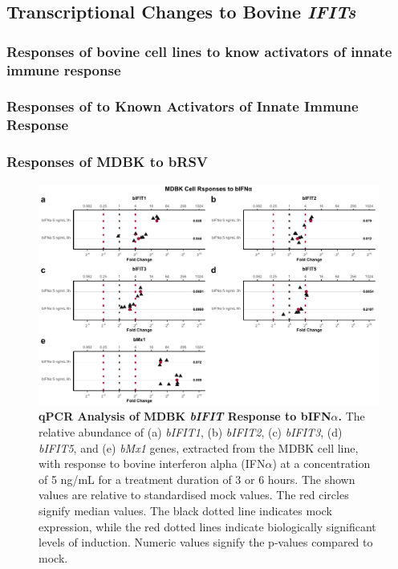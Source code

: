 \subsection{Transcriptional Changes to Bovine \textit{IFITs}}
\subsubsection{Responses of bovine cell lines to know activators of innate immune response} \label{Responses of bovine cell lines to know activators of innate immune response}
\subsubsection{Responses of to Known Activators of Innate Immune Response} \label{Responses to Known Activators of Innate Immune Response}

\subsubsection{Responses of MDBK to bRSV}
\begin{figure}
    \centering
    \includegraphics[width=1\linewidth]{07. Chapter 2/Figs/02. Induction/01. mdbk_treat_bifna.pdf}
    \caption[qPCR Analysis of MDBK \textit{bIFIT} Response to bIFN\(\alpha\).]{\textbf{qPCR Analysis of MDBK \textit{bIFIT} Response to bIFN\(\alpha\).} The relative abundance of (a) \textit{bIFIT1}, (b) \textit{bIFIT2}, (c) \textit{bIFIT3}, (d) \textit{bIFIT5}, and (e) \textit{bMx1} genes, extracted from the MDBK cell line, with response to bovine interferon alpha (IFN\(\alpha\)) at a concentration of 5 ng/mL for a treatment duration of 3 or 6 hours. The shown values are relative to standardised mock values. The red circles signify median values. The black dotted line indicates mock expression, while the red dotted lines indicate biologically significant levels of induction. Numeric values signify the p-values compared to mock.}
    \label{MDBK responses to bIFNa}
\end{figure}

